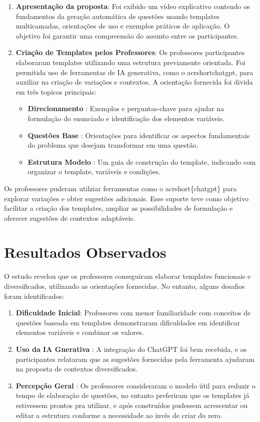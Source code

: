 \begin{enumerate}
    \item \textbf{Apresentação da proposta}:  Foi exibido um vídeo explicativo contendo os fundamentos da geração automática de questões usando templates multicamadas, orientações de uso e exemplos práticos de aplicação. O objetivo foi garantir uma compreensão do assunto entre os participantes.
    
    \item \textbf{Criação de Templates pelos Professores}:  Os professores participantes elaboraram templates utilizando uma estrutura previamente orientada. Foi permitida uso de ferramentas de IA generativa, como o acrshort{chatgpt}, para auxiliar na criação de variações e contextos. A orientação fornecida foi divida em três topicos principais:
    \begin{itemize}
        \item \textbf{Direcionamento} : Exemplos e perguntas-chave para ajudar na formulação do enunciado e identificação dos elementos variáveis.
        \item \textbf{Questões Base} : Orientações para identificar os aspectos fundamentais do problema que desejam transformar em uma questão.
        \item \textbf{Estrutura Modelo} : Um guia de construção do template, indicando com organizar o template, variáveis e condições.
    \end{itemize}
\end{enumerate}

Os professores puderam utilziar ferramentas como o  acrshort\{chatgpt\} para explorar variações e obter sugestões adicionais. Esse suporte teve como objetivo facilitar a criação dos templates, ampliar as possibilidades de formulação e oferecer sugestões de contextos adaptáveis.

\section{Resultados Observados}

O estudo revelou que os professores conseguiram elaborar templates funcionais e diversificados, utilizando as orientações fornecidas. No entanto, alguns desafios foram identificados:

\begin{enumerate}
    \item \textbf{Dificuldade Inicial}: Professores com menor familiaridade com conceitos de questões baseada em templates demonstraram dificuldades em identificar elementos variáveis e combinar os valores.
    \item \textbf{Uso da IA Gnerativa} : A integração do ChatGPT foi bem recebida, e os participantes relataram que as sugestões fornecidas pela ferramenta ajudaram na proposta de contextos diversificados.
    \item \textbf{Percepção Geral} : Os professores consideraram o modelo útil para reduzir o tempo de elaboração de questões, no entanto preferiram que os templates já estivessem prontos pra utilizar, e após construídos pudessem acrescentar ou editar a estrutura conforme a necessidade ao invés de criar do zero.
\end{enumerate}

